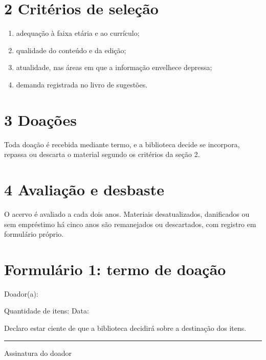 \section*{2 Critérios de seleção}
\begin{enumerate}[label=\alph*)]
  \item adequação à faixa etária e ao currículo;
  \item qualidade do conteúdo e da edição;
  \item atualidade, nas áreas em que a informação envelhece depressa;
  \item demanda registrada no livro de sugestões.
\end{enumerate}

\section*{3 Doações}
Toda doação é recebida mediante termo, e a biblioteca decide se incorpora, repassa ou descarta o material segundo os critérios da seção 2.

\section*{4 Avaliação e desbaste}
O acervo é avaliado a cada dois anos. Materiais desatualizados, danificados ou sem empréstimo há cinco anos são remanejados ou descartados, com registro em formulário próprio.

\section*{Formulário 1: termo de doação}
\noindent Doador(a): \hrulefill\par\smallskip
\noindent Quantidade de itens: \underline{\hspace{2cm}}\quad Data: \underline{\hspace{3cm}}\par\smallskip
\noindent Declaro estar ciente de que a biblioteca decidirá sobre a destinação dos itens.\par\bigskip
\noindent\hfill\rule{6cm}{0.4pt}\par
\noindent\hfill Assinatura do doador
